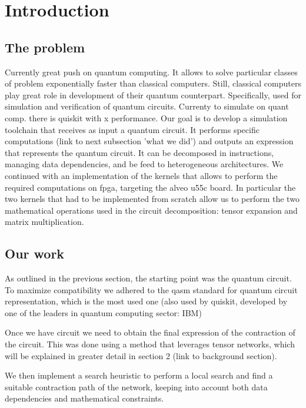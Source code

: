 \documentclass[12pt,oneside,a4paper]{article}
\begin{document}
\newpage
\tableofcontents

\newpage


\section{Introduction}


\subsection{The problem}
Currently great push on quantum computing. It allows to solve particular classes of problem exponentially faster than classical computers.
Still, classical computers play great role in development of their quantum counterpart. Specifically, used for simulation and verification of quantum circuits.
Currenty to simulate on quant comp. there is quiskit with x performance.
Our goal is to develop a simulation toolchain that receives as input a quantum circuit. It performs specific computations (link to next subsection 'what we did') and outputs an expression that represents the quantum circuit. It can be decomposed in instructions, managing data dependencies, and be feed to heterogeneous architectures.
We continued with an implementation of the kernels that allows to perform the required computations on fpga, targeting the alveo u55c board. In particular the two kernels that had to be implemented from scratch allow us to perform the two mathematical operations used in the circuit decomposition: tensor expansion and matrix multiplication.


\subsection{Our work}
As outlined in the previous section, the starting point was the quantum circuit.
To maximize compatibility we adhered to the qasm standard for quantum circuit representation, which is the most used one (also used by quiskit, developed by one of the leaders in quantum computing sector: IBM)

Once we have circuit we need to obtain the final expression of the contraction of the circuit. This was done using a method that leverages tensor networks, which will be explained in greater detail in section 2 (link to background section).

We then implement a search heuristic to perform a local search and find a suitable contraction path of the network, keeping into account both data dependencies and mathematical constraints.
\end{document}
